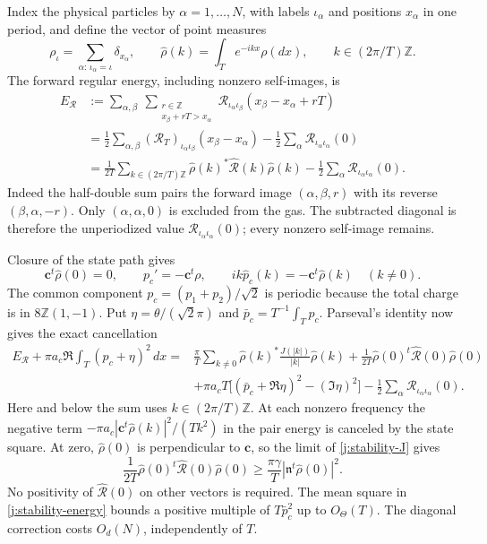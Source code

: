 Index the physical particles by \(\alpha=1,\ldots,N\), with labels \(\iota_\alpha\) and positions \(x_\alpha\) in one period, and define the vector of point measures
\[
\rho_\iota=\sum_{\alpha:\,\iota_\alpha=\iota}\delta_{x_\alpha},
\qquad
\widehat\rho(k)=\int_T e^{-ikx}\rho(dx),\qquad
k\in(2\pi/T)\mathbb Z.
\]
The forward regular energy, including nonzero self-images, is
\[
\begin{aligned}
E_{\mathcal R}
&:=\sum_{\alpha,\beta}\ 
\sum_{\substack{r\in\mathbb Z\\x_\beta+rT>x_\alpha}}
\mathcal R_{\iota_\alpha\iota_\beta}(x_\beta-x_\alpha+rT)\\
&=\frac12\sum_{\alpha,\beta}
(\mathcal R_T)_{\iota_\alpha\iota_\beta}(x_\beta-x_\alpha)
-\frac12\sum_\alpha\mathcal R_{\iota_\alpha\iota_\alpha}(0)\\
&=\frac1{2T}\sum_{k\in(2\pi/T)\mathbb Z}
\widehat\rho(k)^*\widehat{\mathcal R}(k)\widehat\rho(k)
-\frac12\sum_\alpha\mathcal R_{\iota_\alpha\iota_\alpha}(0).
\end{aligned}
\]
Indeed the half-double sum pairs the forward image \((\alpha,\beta,r)\) with its reverse \((\beta,\alpha,-r)\). Only \((\alpha,\alpha,0)\) is excluded from the gas. The subtracted diagonal is therefore the unperiodized value \(\mathcal R_{\iota_\alpha\iota_\alpha}(0)\); every nonzero self-image remains.

Closure of the state path gives
\[
\boldsymbol c^t\widehat\rho(0)=0,\qquad
p_c'=-\boldsymbol c^t\rho,\qquad
ik\widehat p_c(k)=-\boldsymbol c^t\widehat\rho(k)\quad(k\ne0).
\]
The common component \(p_c=(p_1+p_2)/\sqrt2\) is periodic because the total charge is in \(8\mathbb Z(1,-1)\). Put \(\eta=\theta/(\sqrt2\pi)\) and
\(\bar p_c=T^{-1}\int_Tp_c\). Parseval's identity now gives the exact cancellation
\begin{equation}\label{j:stability-energy}
\begin{aligned}
E_{\mathcal R}
+\pi a_c\Re\int_T(p_c+\eta)^2\,dx
={}&\frac{\pi}{T}\sum_{k\ne0}
\widehat\rho(k)^*\frac{J(|k|)}{|k|}\widehat\rho(k)
+\frac1{2T}\widehat\rho(0)^t\widehat{\mathcal R}(0)\widehat\rho(0)\\
&+\pi a_cT\bigl[(\bar p_c+\Re\eta)^2-(\Im\eta)^2\bigr]
-\frac12\sum_\alpha\mathcal R_{\iota_\alpha\iota_\alpha}(0).
\end{aligned}
\end{equation}
Here and below the sum uses \(k\in(2\pi/T)\mathbb Z\). At each nonzero frequency the negative term
\(-\pi a_c|\boldsymbol c^t\widehat\rho(k)|^2/(Tk^2)\) in the pair energy is canceled by the state square. At zero, \(\widehat\rho(0)\) is perpendicular to \(\boldsymbol c\), so the limit of \eqref{j:stability-J} gives
\[
\frac1{2T}\widehat\rho(0)^t\widehat{\mathcal R}(0)\widehat\rho(0)
\ge\frac{\pi\gamma}{T}
\left|\mathfrak n^t\widehat\rho(0)\right|^2.
\]
No positivity of \(\widehat{\mathcal R}(0)\) on other vectors is required. The mean square in \eqref{j:stability-energy} bounds a positive multiple of \(T\bar p_c^2\) up to \(O_\Theta(T)\). The diagonal correction costs \(O_d(N)\), independently of \(T\).

